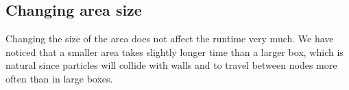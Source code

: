 \documentclass[a4paper]{article}
\begin{document}
\subsection{Changing area size}

Changing the size of the area does not affect the runtime very much. We
have noticed that a smaller area takes slightly longer time than a
larger box, which is natural since particles will collide with walls and
to travel between nodes more often than in large boxes.\\
\end{document}
